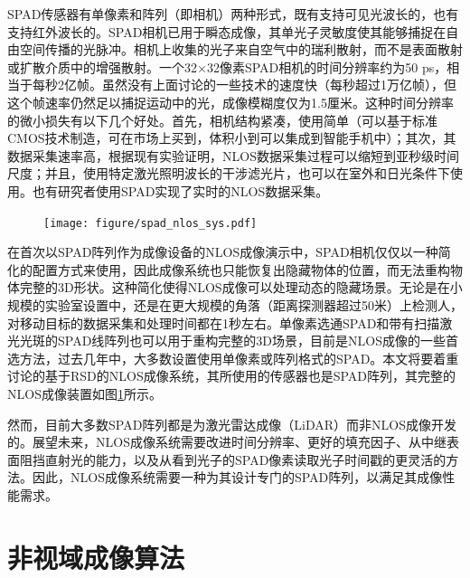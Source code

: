 \documentclass[master]{shtthesis}             %
\begin{document}
SPAD传感器有单像素和阵列（即相机）两种形式，既有支持可见光波长的\citep{richardson200932,richardson2011scaleable,gersbach2012time,bronzi2014100,burri2016linospad}，也有支持红外波长的\citep{itzler2008geiger,itzler2008single,itzler2007single}。SPAD相机已用于瞬态成像，其单光子灵敏度使其能够捕捉在自由空间传播的光脉冲。相机上收集的光子来自空气中的瑞利散射，而不是表面散射或扩散介质中的增强散射\citep{gariepy2015single}。一个32$\times$32像素SPAD相机的时间分辨率约为50 ps，相当于每秒2亿帧。虽然没有上面讨论的一些技术的速度快（每秒超过1万亿帧），但这个帧速率仍然足以捕捉运动中的光，成像模糊度仅为1.5厘米。这种时间分辨率的微小损失有以下几个好处。首先，相机结构紧凑，使用简单（可以基于标准CMOS技术制造，可在市场上买到，体积小到可以集成到智能手机中）；其次，其数据采集速率高，根据现有实验证明，NLOS数据采集过程可以缩短到亚秒级时间尺度\citep{musarra2019non}；并且，使用特定激光照明波长的干涉滤光片，也可以在室外和日光条件下使用\citep{Otoole2018,chan2017non}。也有研究者使用SPAD实现了实时的NLOS数据采集\citep{lindell2018towards}。

\begin{figure}[!tb]
  \centering
  \texttt{[image: figure/spad\_nlos\_sys.pdf]}
  \label{fig:spad_nlos_sys_img}
\end{figure}

在首次以SPAD阵列作为成像设备的NLOS成像演示中，SPAD相机仅仅以一种简化的配置方式来使用，因此成像系统也只能恢复出隐藏物体的位置，而无法重构物体完整的3D形状\citep{chan2017non}。这种简化使得NLOS成像可以处理动态的隐藏场景。无论是在小规模的实验室设置中，还是在更大规模的角落（距离探测器超过50米）上检测人\citep{gariepy2016detection}，对移动目标的数据采集和处理时间都在1秒左右。单像素选通SPAD\citep{buttafava2015non}和带有扫描激光光斑的SPAD线阵列\citep{o2017reconstructing}也可以用于重构完整的3D场景，目前是NLOS成像的一些首选方法，过去几年中，大多数设置使用单像素或阵列格式的SPAD。本文将要着重讨论的基于RSD的NLOS成像系统，其所使用的传感器也是SPAD阵列，其完整的NLOS成像装置如图\ref{fig:spad_nlos_sys_img}所示。

然而，目前大多数SPAD阵列都是为激光雷达成像（LiDAR）而非NLOS成像开发的。展望未来，NLOS成像系统需要改进时间分辨率、更好的填充因子、从中继表面阻挡直射光的能力，以及从看到光子的SPAD像素读取光子时间戳的更灵活的方法。因此，NLOS成像系统需要一种为其设计专门的SPAD阵列，以满足其成像性能需求。

\section{非视域成像算法}\label{sec:img_algo}
\end{document}

